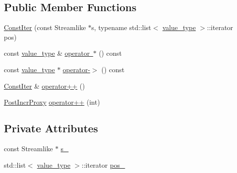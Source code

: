 \subsection*{Public Member Functions}
\begin{DoxyCompactItemize}
\item 
\mbox{\hyperlink{classtesting_1_1gmock__matchers__test_1_1_streamlike_1_1_const_iter_ad986f4c477f42fe95dba4aedac08bcda}{Const\+Iter}} (const Streamlike $\ast$s, typename std\+::list$<$ \mbox{\hyperlink{classtesting_1_1gmock__matchers__test_1_1_streamlike_a7e2c2e021676c1ed5dea63cdd019661c}{value\+\_\+type}} $>$\+::iterator pos)
\item 
const \mbox{\hyperlink{classtesting_1_1gmock__matchers__test_1_1_streamlike_a7e2c2e021676c1ed5dea63cdd019661c}{value\+\_\+type}} \& \mbox{\hyperlink{classtesting_1_1gmock__matchers__test_1_1_streamlike_1_1_const_iter_ae9883d3a3cc1d424a1d5251f88f0e854}{operator $\ast$}} () const
\item 
const \mbox{\hyperlink{classtesting_1_1gmock__matchers__test_1_1_streamlike_a7e2c2e021676c1ed5dea63cdd019661c}{value\+\_\+type}} $\ast$ \mbox{\hyperlink{classtesting_1_1gmock__matchers__test_1_1_streamlike_1_1_const_iter_a639c3c1aba0cd794546eef5748acedfd}{operator-\/$>$}} () const
\item 
\mbox{\hyperlink{classtesting_1_1gmock__matchers__test_1_1_streamlike_1_1_const_iter}{Const\+Iter}} \& \mbox{\hyperlink{classtesting_1_1gmock__matchers__test_1_1_streamlike_1_1_const_iter_a9bcafc679a4e5bf63060bcee69a983f9}{operator++}} ()
\item 
\mbox{\hyperlink{classtesting_1_1gmock__matchers__test_1_1_streamlike_1_1_const_iter_1_1_post_incr_proxy}{Post\+Incr\+Proxy}} \mbox{\hyperlink{classtesting_1_1gmock__matchers__test_1_1_streamlike_1_1_const_iter_a2c47b9a343e5360282885f6ac57afdb5}{operator++}} (int)
\end{DoxyCompactItemize}
\subsection*{Private Attributes}
\begin{DoxyCompactItemize}
\item 
const Streamlike $\ast$ \mbox{\hyperlink{classtesting_1_1gmock__matchers__test_1_1_streamlike_1_1_const_iter_a159a45a0271c596ad01ae70d9a5be69d}{s\+\_\+}}
\item 
std\+::list$<$ \mbox{\hyperlink{classtesting_1_1gmock__matchers__test_1_1_streamlike_a7e2c2e021676c1ed5dea63cdd019661c}{value\+\_\+type}} $>$\+::iterator \mbox{\hyperlink{classtesting_1_1gmock__matchers__test_1_1_streamlike_1_1_const_iter_a829a92cb79cc5c30841552385c609f82}{pos\+\_\+}}
\end{DoxyCompactItemize}
